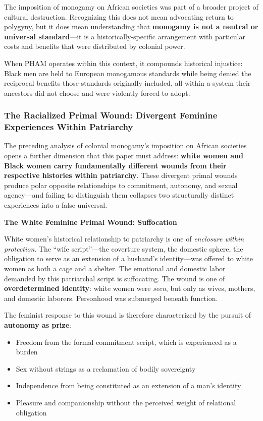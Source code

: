 \documentclass[12pt, letterpaper]{article}
\begin{document}
The imposition of monogamy on African societies was part of a broader project of cultural destruction. Recognizing this does not mean advocating return to polygyny, but it does mean understanding that \textbf{monogamy is not a neutral or universal standard}---it is a historically-specific arrangement with particular costs and benefits that were distributed by colonial power.

When PHAM operates within this context, it compounds historical injustice: Black men are held to European monogamous standards while being denied the reciprocal benefits those standards originally included, all within a system their ancestors did not choose and were violently forced to adopt.

\subsubsection{The Racialized Primal Wound: Divergent Feminine Experiences Within Patriarchy}

The preceding analysis of colonial monogamy's imposition on African societies opens a further dimension that this paper must address: \textbf{white women and Black women carry fundamentally different wounds from their respective histories within patriarchy}. These divergent primal wounds produce polar opposite relationships to commitment, autonomy, and sexual agency---and failing to distinguish them collapses two structurally distinct experiences into a false universal.

\textbf{The White Feminine Primal Wound: Suffocation}

White women's historical relationship to patriarchy is one of \textit{enclosure within protection}. The ``wife script''---the coverture system, the domestic sphere, the obligation to serve as an extension of a husband's identity---was offered to white women as both a cage and a shelter. The emotional and domestic labor demanded by this patriarchal script is suffocating. The wound is one of \textbf{overdetermined identity}: white women were \textit{seen}, but only as wives, mothers, and domestic laborers. Personhood was submerged beneath function.

The feminist response to this wound is therefore characterized by the pursuit of \textbf{autonomy as prize}:

\begin{itemize}
    \item Freedom from the formal commitment script, which is experienced as a burden
    \item Sex without strings as a reclamation of bodily sovereignty
    \item Independence from being constituted as an extension of a man's identity
    \item Pleasure and companionship without the perceived weight of relational obligation
\end{itemize}
\end{document}
